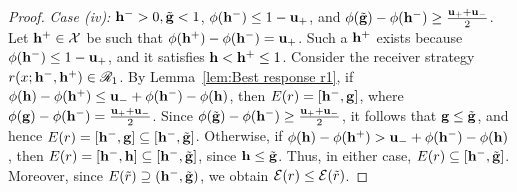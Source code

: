\begin{proof}
\noindent \textit{Case (iv): }{$\ib > 0, \tilde{\gb} < 1$, $\phi(\ib) \le 1 - \up$, and $\phi(\tilde{\gb}) - \phi(\ib) \geq \frac{\up + \um}{2}$.}\\
Let $\jb \in \cg{X}$ be such that $\phi(\jb) - \phi(\ib) = \up$. Such a $\jb$ exists because $\phi(\ib) \le 1-\up$, and it satisfies $\h < \jb \le 1$. Consider the receiver strategy $r(x;\ib,\jb) \in \sr{R}_1$. By Lemma~\ref{lem:Best response r1}, if $ \phi(\h) - \phi(\jb) \le \um + \phi(\ib) - \phi(\h)$, then $E(r) = [\ib,\gb]$, where $\phi(\gb) - \phi(\ib) = \frac{\up+\um}{2}$. Since $\phi(\tilde{\gb}) - \phi(\ib) \ge \frac{\up+\um}{2}$, it follows that $\gb \le \tilde{\gb}$, and hence $E(r) = [\ib,\gb] \subseteq [\ib,\tilde{\gb}]$. Otherwise, if $\phi(\h) - \phi(\jb) > \um + \phi(\ib) - \phi(\h)$, then $E(r) = [\ib,\h] \subseteq [\ib,\tilde{\gb}]$, since $\h \le \tilde{\gb}$. Thus, in either case, $E(r) \subseteq [\ib,\tilde{\gb}]$. Moreover, since $E(\rt) \supseteq (\ib,\tilde{\gb})$, we obtain $\cg{E}(r) \le \cg{E}(\rt)$.



\end{proof}
